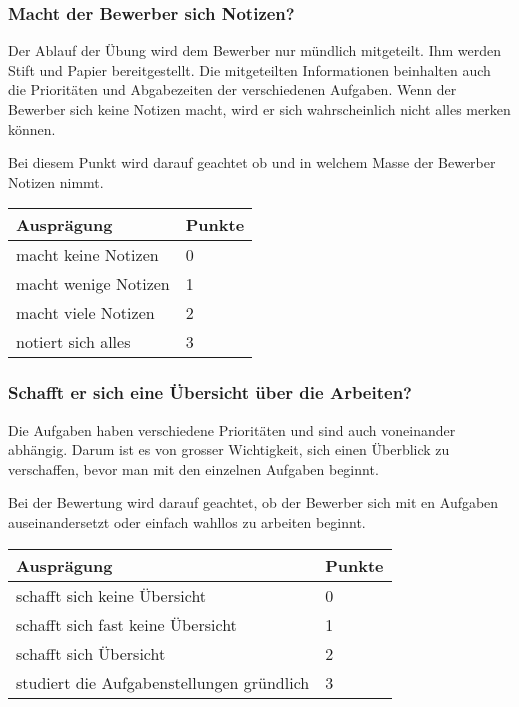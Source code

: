 \subsubsection{Macht der Bewerber sich Notizen?}
Der Ablauf der Übung wird dem Bewerber nur mündlich mitgeteilt. Ihm werden Stift und Papier bereitgestellt. Die mitgeteilten Informationen beinhalten auch die Prioritäten und Abgabezeiten der verschiedenen Aufgaben. Wenn der Bewerber sich keine Notizen macht, wird er sich wahrscheinlich nicht alles merken können. 

Bei diesem Punkt wird darauf geachtet ob und in welchem Masse der Bewerber Notizen nimmt.

\begin{center}
  \begin{tabular}{ | p{5cm} | p{1cm} |}
   \hline
   \textbf{Ausprägung} & \textbf{Punkte} \\ \hline
   macht keine Notizen & 0 \\ \hline
   macht wenige Notizen & 1 \\ \hline
   macht viele Notizen & 2 \\ \hline
   notiert sich alles  & 3\\ \hline
  \end{tabular}
\end{center}


\subsubsection{Schafft er sich eine Übersicht über die Arbeiten?}
Die Aufgaben haben verschiedene Prioritäten und sind auch voneinander abhängig. Darum ist es von grosser Wichtigkeit, sich einen Überblick zu verschaffen, bevor man mit den einzelnen Aufgaben beginnt.

Bei der Bewertung wird darauf geachtet, ob der Bewerber sich mit en Aufgaben auseinandersetzt oder einfach wahllos zu arbeiten beginnt.

\begin{center}
  \begin{tabular}{ | p{6.5cm} | p{1cm} |}
   \hline
   \textbf{Ausprägung} & \textbf{Punkte} \\ \hline
   schafft sich keine Übersicht & 0 \\ \hline
   schafft sich fast keine Übersicht & 1 \\ \hline
   schafft sich Übersicht & 2 \\ \hline
   studiert die Aufgabenstellungen gründlich  & 3\\ \hline
  \end{tabular}
\end{center}


